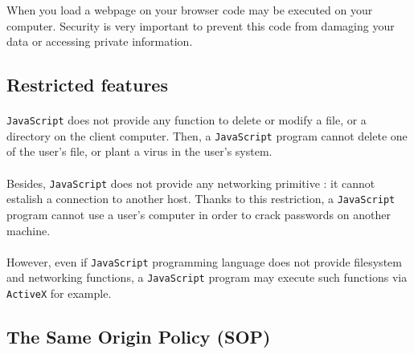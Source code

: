 When you load a webpage on your browser code may be executed on your computer. Security is very important to prevent this code from damaging your data or accessing private information.

\subsection{Restricted features}

\paragraph{}
\texttt{JavaScript} does not provide any function to delete or modify a file, or a directory on the client computer. Then, a \texttt{JavaScript} program cannot delete one of the user's file, or plant a virus in the user's system.

\paragraph{}
Besides, \texttt{JavaScript} does not provide any networking primitive : it cannot estalish a connection to another host. Thanks to this restriction, a \texttt{JavaScript} program cannot use a user's computer in order to crack passwords on another machine.

\paragraph{}
However, even if \texttt{JavaScript} programming language does not provide filesystem and networking functions, a \texttt{JavaScript} program may execute such functions via \texttt{ActiveX} for example.

\subsection{The Same Origin Policy (SOP)}

